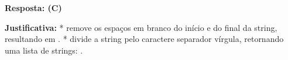 \ifmostrarGabarito
\textbf{Resposta: (C)}

\textbf{Justificativa:}
*  remove os espaços em branco do início e do final da string, resultando em .
*  divide a string pelo caractere separador vírgula, retornando uma lista de strings: .

\fi
